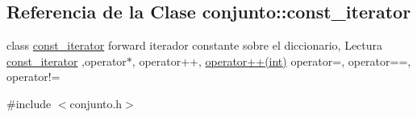 \hypertarget{classconjunto_1_1const__iterator}{\subsection{Referencia de la Clase conjunto\-:\-:const\-\_\-iterator}
\label{classconjunto_1_1const__iterator}
}


class \hyperlink{classconjunto_1_1const__iterator}{const\-\_\-iterator} forward iterador constante sobre el diccionario, Lectura \hyperlink{classconjunto_1_1const__iterator}{const\-\_\-iterator} ,operator$\ast$, operator++, \hyperlink{classconjunto_1_1const__iterator_a2cd2caa5e80305a5cfd5e49fc4179b63}{operator++(int)} operator=, operator==, operator!=  




{\ttfamily \#include $<$conjunto.\-h$>$}

